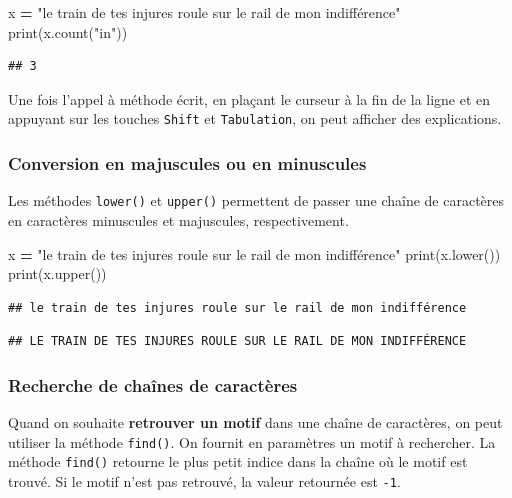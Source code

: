 \documentclass[12pt,]{book}
\newenvironment{Shaded}{\begin{snugshade}}{\end{snugshade}}
\newcommand{\StringTok}[1]{\textcolor[rgb]{0.31,0.60,0.02}{#1}}
\newcommand{\OperatorTok}[1]{\textcolor[rgb]{0.81,0.36,0.00}{\textbf{#1}}}
\newcommand{\BuiltInTok}[1]{#1}
\newcommand{\NormalTok}[1]{#1}
\numberwithin{equation}{section}
\numberwithin{countremarque}{section}
\let\BeginKnitrBlock\begin \let\EndKnitrBlock\end
\begin{document}
\begin{Shaded}
\begin{Highlighting}[]
\NormalTok{x }\OperatorTok{=} \StringTok{"le train de tes injures roule sur le rail de mon indifférence"}
\BuiltInTok{print}\NormalTok{(x.count(}\StringTok{"in"}\NormalTok{))}
\end{Highlighting}
\end{Shaded}

\begin{lstlisting}
## 3
\end{lstlisting}

\BeginKnitrBlock{remarque}
Une fois l'appel à méthode écrit, en plaçant le curseur à la fin de la
ligne et en appuyant sur les touches \texttt{Shift} et
\texttt{Tabulation}, on peut afficher des explications.
\EndKnitrBlock{remarque}

\subsubsection{Conversion en majuscules ou en
minuscules}\label{conversion-en-majuscules-ou-en-minuscules}

Les méthodes \texttt{lower()} et \texttt{upper()} permettent de passer
une chaîne de caractères en caractères minuscules et majuscules,
respectivement.

\begin{Shaded}
\begin{Highlighting}[]
\NormalTok{x }\OperatorTok{=} \StringTok{"le train de tes injures roule sur le rail de mon indifférence"}
\BuiltInTok{print}\NormalTok{(x.lower())}
\BuiltInTok{print}\NormalTok{(x.upper())}
\end{Highlighting}
\end{Shaded}

\begin{lstlisting}
## le train de tes injures roule sur le rail de mon indifférence
\end{lstlisting}

\begin{lstlisting}
## LE TRAIN DE TES INJURES ROULE SUR LE RAIL DE MON INDIFFÉRENCE
\end{lstlisting}

\subsubsection{Recherche de chaînes de
caractères}\label{recherche-de-chaines-de-caracteres}

Quand on souhaite \textbf{retrouver un motif} dans une chaîne de
caractères, on peut utiliser la méthode \texttt{find()}. On fournit en
paramètres un motif à rechercher. La méthode \texttt{find()} retourne le
plus petit indice dans la chaîne où le motif est trouvé. Si le motif
n'est pas retrouvé, la valeur retournée est \texttt{-1}.
\end{document}
